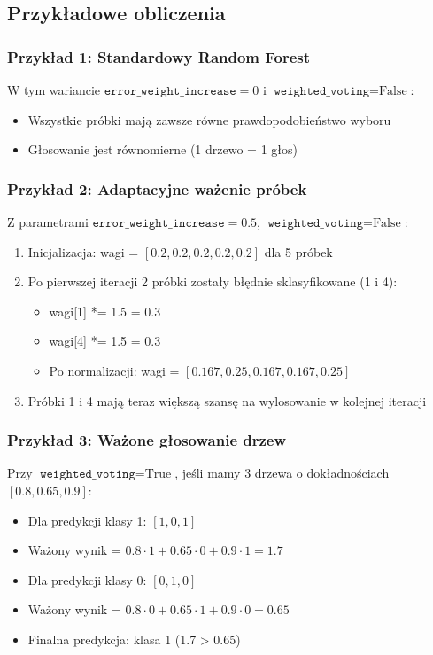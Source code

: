 \documentclass[12pt,a4paper]{article}
\begin{document}
\subsection{Przykładowe obliczenia}

\subsubsection{Przykład 1: Standardowy Random Forest}
W tym wariancie $\texttt{error\_weight\_increase} = 0$ i $\texttt{weighted\_voting} = \text{False}$:
\begin{itemize}
    \item Wszystkie próbki mają zawsze równe prawdopodobieństwo wyboru
    \item Głosowanie jest równomierne (1 drzewo = 1 głos)
\end{itemize}

\subsubsection{Przykład 2: Adaptacyjne ważenie próbek}
Z parametrami $\texttt{error\_weight\_increase} = 0.5$, $\texttt{weighted\_voting} = \text{False}$:

\begin{enumerate}
    \item Inicjalizacja: wagi = $[0.2, 0.2, 0.2, 0.2, 0.2]$ dla 5 próbek
    \item Po pierwszej iteracji 2 próbki zostały błędnie sklasyfikowane (1 i 4):
    \begin{itemize}
        \item wagi[1] *= 1.5 = 0.3
        \item wagi[4] *= 1.5 = 0.3
        \item Po normalizacji: wagi = $[0.167, 0.25, 0.167, 0.167, 0.25]$
    \end{itemize}
    \item Próbki 1 i 4 mają teraz większą szansę na wylosowanie w kolejnej iteracji
\end{enumerate}

\subsubsection{Przykład 3: Ważone głosowanie drzew}
Przy $\texttt{weighted\_voting} = \text{True}$, jeśli mamy 3 drzewa o dokładnościach $[0.8, 0.65, 0.9]$:
\begin{itemize}
    \item Dla predykcji klasy 1: $[1, 0, 1]$
    \item Ważony wynik = $0.8 \cdot 1 + 0.65 \cdot 0 + 0.9 \cdot 1 = 1.7$
    \item Dla predykcji klasy 0: $[0, 1, 0]$
    \item Ważony wynik = $0.8 \cdot 0 + 0.65 \cdot 1 + 0.9 \cdot 0 = 0.65$
    \item Finalna predykcja: klasa 1 (1.7 > 0.65)
\end{itemize}
\end{document}
